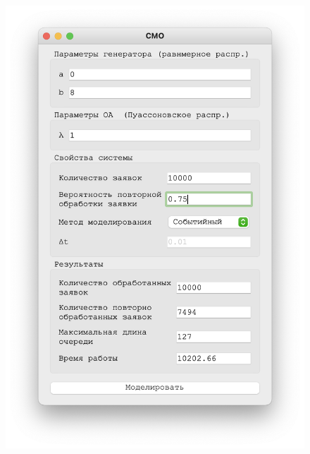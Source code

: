  
 \begin{figure}[!htb]
    \begin{minipage}{0.55\textwidth}
      \centering
      \includegraphics[width=1\linewidth]{1-75-s}
    \end{minipage}\hfill
    \begin{minipage}{0.55\textwidth}
      \centering

\end{minipage}
\end{figure}
